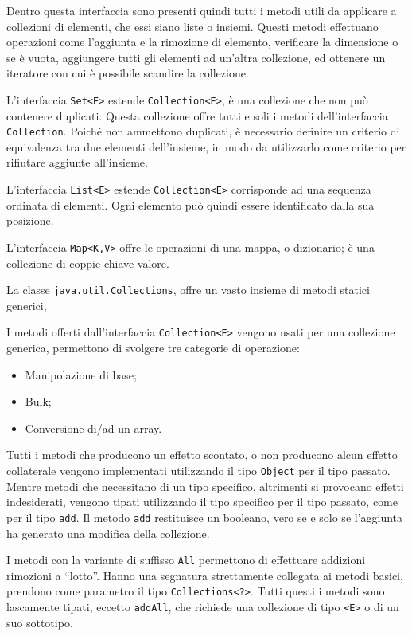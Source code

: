 \documentclass{article}
\numberwithin{equation}{subsection}
\begin{document}
Dentro questa interfaccia sono presenti quindi tutti i metodi utili da applicare a collezioni di elementi, che essi siano liste o insiemi. Questi metodi effettuano operazioni 
come l'aggiunta e la rimozione di elemento, verificare la dimensione o se è vuota, aggiungere tutti gli elementi ad un'altra collezione, ed ottenere un iteratore con cui 
è possibile scandire la collezione. 


L'interfaccia \verb|Set<E>| estende \verb|Collection<E>|, è una collezione che non può contenere duplicati. Questa collezione offre tutti e soli i metodi dell'interfaccia 
\verb|Collection|. 
Poiché non ammettono duplicati, è necessario definire un criterio di equivalenza tra due elementi dell'insieme, in modo da utilizzarlo come criterio per rifiutare aggiunte 
all'insieme. 

L'interfaccia \verb|List<E>| estende \verb|Collection<E>| corrisponde ad una sequenza ordinata di elementi. Ogni elemento può quindi essere identificato dalla sua posizione. 

L'interfaccia \verb|Map<K,V>| offre le operazioni di una mappa, o dizionario; è una collezione di coppie chiave-valore. 

La classe \verb|java.util.Collections|, offre un vasto insieme di metodi statici generici, %


I metodi offerti dall'interfaccia \verb|Collection<E>| vengono usati per una collezione generica, permettono di svolgere tre categorie di operazione:
\begin{itemize}
    \item Manipolazione di base;
    \item Bulk;
    \item Conversione di/ad un array. 
\end{itemize}

Tutti i metodi che producono un effetto scontato, o non producono alcun effetto collaterale vengono implementati utilizzando il tipo \verb|Object| per il tipo passato. 
Mentre metodi che necessitano di un tipo specifico, altrimenti si provocano effetti indesiderati, vengono tipati utilizzando il tipo specifico per il tipo passato, come per il 
tipo \verb|add|.
Il metodo \verb|add| restituisce un booleano, vero se e solo se l'aggiunta ha generato una modifica della collezione. 


I metodi con la variante di suffisso \verb|All| permettono di effettuare addizioni rimozioni a ``lotto''. Hanno una segnatura strettamente collegata ai metodi basici, 
prendono come parametro il tipo \verb|Collections<?>|. Tutti questi i metodi sono lascamente tipati, eccetto \verb|addAll|, che richiede una collezione di tipo \verb|<E>| o di 
un suo sottotipo. 
\end{document}

